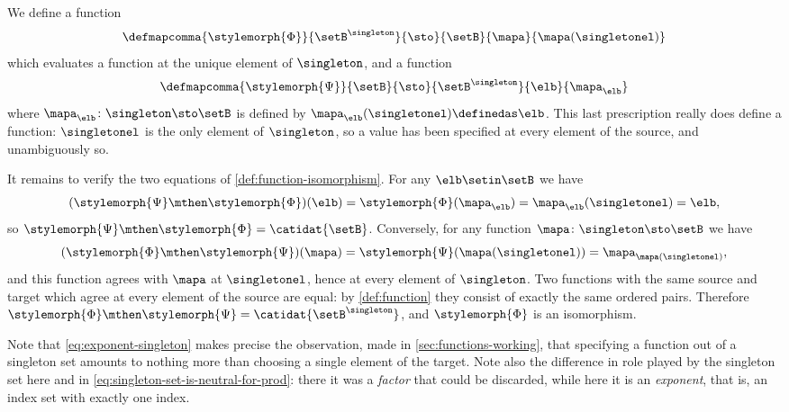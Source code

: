 \begin{solution}
    We define a function
    \begin{equation}
        \defmapcomma{
            \stylemorph{\Phi}
        }{
            \setB^{\singleton}
        }{
            \sto
        }{
            \setB
        }{
            \mapa
        }{
            \mapa(\singletonel)
        }
    \end{equation}
    which evaluates a function at the unique element of $\singleton$, and a function
    \begin{equation}
        \defmapcomma{
            \stylemorph{\Psi}
        }{
            \setB
        }{
            \sto
        }{
            \setB^{\singleton}
        }{
            \elb
        }{
            \mapa_{\elb}
        }
    \end{equation}
    where $\mapa_{\elb} \colon \singleton \sto \setB$ is defined by $\mapa_{\elb}(\singletonel) \definedas \elb$.
    This last prescription really does define a function: $\singletonel$ is the only element of $\singleton$, so a value has been specified at every element of the source, and unambiguously so.

    It remains to verify the two equations of \cref{def:function-isomorphism}.
    For any $\elb \setin \setB$ we have
    \begin{equation}
        (\stylemorph{\Psi} \mthen \stylemorph{\Phi})(\elb) = \stylemorph{\Phi}(\mapa_{\elb}) = \mapa_{\elb}(\singletonel) = \elb,
    \end{equation}
    so $\stylemorph{\Psi} \mthen \stylemorph{\Phi} = \catidat{\setB}$.
    Conversely, for any function $\mapa \colon \singleton \sto \setB$ we have
    \begin{equation}
        (\stylemorph{\Phi} \mthen \stylemorph{\Psi})(\mapa) = \stylemorph{\Psi}(\mapa(\singletonel)) = \mapa_{\mapa(\singletonel)},
    \end{equation}
    and this function agrees with $\mapa$ at $\singletonel$, hence at every element of $\singleton$.
    Two functions with the same source and target which agree at every element of the source are equal: by \cref{def:function} they consist of exactly the same ordered pairs.
    Therefore $\stylemorph{\Phi} \mthen \stylemorph{\Psi} = \catidat{\setB^{\singleton}}$, and $\stylemorph{\Phi}$ is an isomorphism.
\end{solution}

Note that \cref{eq:exponent-singleton} makes precise the observation, made in \cref{sec:functions-working}, that specifying a function out of a singleton set amounts to nothing more than choosing a single element of the target.
Note also the difference in role played by the singleton set here and in \cref{eq:singleton-set-is-neutral-for-prod}: there it was a \emph{factor} that could be discarded, while here it is an \emph{exponent}, that is, an index set with exactly one index.

